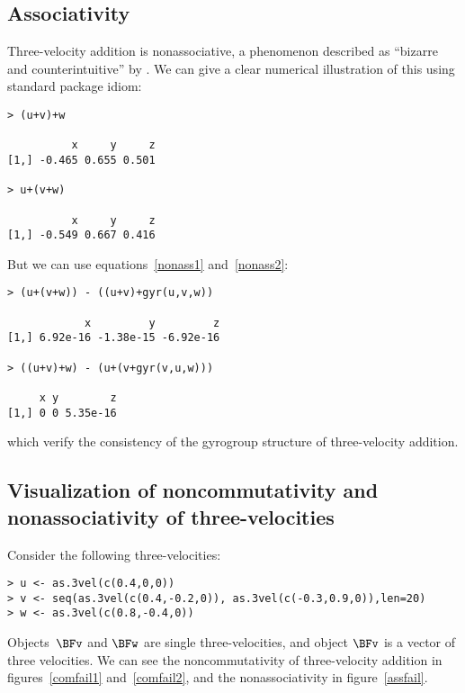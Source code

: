 \documentclass[ijoc,nonblindrev]{informs3} %
\begin{document}
\subsection{Associativity}

Three-velocity addition is nonassociative, a phenomenon described as
``bizarre and counterintuitive'' by \cite{ungar1997}.  We can give a
clear numerical illustration of this using standard package idiom:

\begin{verbatim}
> (u+v)+w

          x     y     z
[1,] -0.465 0.655 0.501

> u+(v+w)

          x     y     z 
[1,] -0.549 0.667 0.416

\end{verbatim}

But we can use equations~\ref{nonass1} and~\ref{nonass2}:

\begin{verbatim}
> (u+(v+w)) - ((u+v)+gyr(u,v,w))

            x         y         z
[1,] 6.92e-16 -1.38e-15 -6.92e-16

> ((u+v)+w) - (u+(v+gyr(v,u,w)))

     x y        z
[1,] 0 0 5.35e-16

\end{verbatim}

which verify the consistency of the gyrogroup structure of
three-velocity addition.

\subsection{Visualization of noncommutativity and nonassociativity
  of three-velocities}

Consider the following three-velocities:

\begin{verbatim}
> u <- as.3vel(c(0.4,0,0))
> v <- seq(as.3vel(c(0.4,-0.2,0)), as.3vel(c(-0.3,0.9,0)),len=20)
> w <- as.3vel(c(0.8,-0.4,0))

\end{verbatim}

Objects~$\BFv$ and $\BFw$ are single three-velocities, and object
$\BFv$ is a vector of three velocities.  We can see the
noncommutativity of three-velocity addition in figures~\ref{comfail1}
and~\ref{comfail2}, and the nonassociativity in figure~\ref{assfail}.
\end{document}
